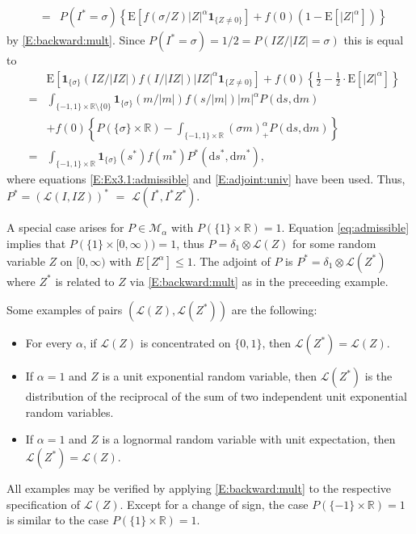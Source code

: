 \documentclass{aptpubarxiv}
\numberwithin{equation}{section}
\begin{document}
\begin{ex}
\begin{eqnarray*}
&=&P(I^\ast = \sigma)\left\{{\mathrm{E}}[f(\sigma/Z)|Z|^\alpha{\boldsymbol{1}}_{\{Z \neq 0\}}]+f(0)(1-{\mathrm{E}}[|Z|^\alpha]) \right\}
\end{eqnarray*}
by \eqref{E:backward:mult}. Since $P(I^\ast = \sigma)=1/2=P(IZ/|IZ|=\sigma)$ this is equal to
\begin{eqnarray*}
&& {\mathrm{E}}[{\boldsymbol{1}}_{\{\sigma\}}(IZ/|IZ|)f(I/|IZ|)|IZ|^\alpha{\boldsymbol{1}}_{\{Z \neq 0\}}]+f(0)\left\{\frac{1}{2}-\frac{1}{2}\cdot {\mathrm{E}}[|Z|^\alpha]\right\} \\
&=& \int_{\{-1,1\} \times \mathbb{R} \setminus\{0\}}{\boldsymbol{1}}_{\{\sigma\}}(m/|m|)f\left(s/|m|\right)|m|^\alpha P({\mathrm{d}s},{\mathrm{d}m}) \\
&& + f(0)\left\{P(\{\sigma\} \times \mathbb{R})- \int_{\{-1,1\} \times \mathbb{R}}(\sigma m)_+^\alpha P({\mathrm{d}s}, {\mathrm{d}m})\right\}\\
&=& \int_{\{-1,1\}\times\mathbb{R}}{\boldsymbol{1}}_{\{\sigma\}}(s^*)f(m^*)P^*({\mathrm{d}s}^*,{\mathrm{d}m}^*),
\end{eqnarray*}
where equations \eqref{E:Ex3.1:admissible} and \eqref{E:adjoint:univ} have been used. Thus, $P^\ast=(\mathcal{L}(I, IZ))^\ast$ $=$ \linebreak $\mathcal{L}(I^\ast, I^\ast Z^\ast)$.
\end{ex}

\begin{ex}
\label{Ex:adjoint:1}
A special case arises for $P \in \mathcal{M}_\alpha$ with $P(\{1\} \times \mathbb{R})=1$. Equation \eqref{eq:admissible} implies that $P(\{1\} \times [0, \infty))=1$, thus $P = \delta_1 \otimes \mathcal{L}(Z)$ for some random variable $Z$ on $[0, \infty)$ with $E[Z^\alpha] \leq 1$. The adjoint of $P$ is $P^\ast = \delta_1 \otimes \mathcal{L}(Z^\ast)$ where $Z^\ast$ is related to $Z$ via \eqref{E:backward:mult} as in the preceeding example.

Some examples of pairs $(\mathcal{L}(Z), \mathcal{L}(Z^\ast))$ are the following:
\begin{itemize}
\item For every $\alpha$, if $\mathcal{L}(Z)$ is concentrated on $\{0, 1\}$, then $\mathcal{L}(Z^\ast)=\mathcal{L}(Z)$.
\item If $\alpha = 1$ and $Z$ is a unit exponential random variable, then $\mathcal{L}(Z^\ast)$ is the distribution of the reciprocal of the sum of two independent unit exponential random variables.
\item If $\alpha = 1$ and $Z$ is a lognormal random variable with unit expectation, then $\mathcal{L}(Z^\ast) =\mathcal{L}(Z)$.
\end{itemize}
All examples may be verified by applying \eqref{E:backward:mult} to the respective specification of $\mathcal{L}(Z)$.
Except for a change of sign, the case $P(\{-1\} \times \mathbb{R})=1$ is similar to the case $P(\{1\} \times \mathbb{R})=1$.
\end{ex}
\end{document}
